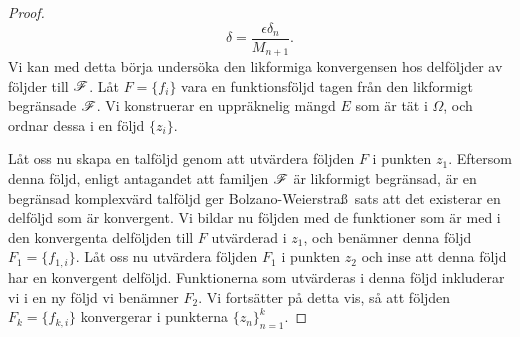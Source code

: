 \begin{proof}
	\begin{equation}
		\label{eq:equidelta}
		\delta = \frac{\epsilon \delta_n}{M_{n+1}}.
	\end{equation}
	Vi kan med detta börja undersöka den likformiga konvergensen hos delföljder av följder till $\mathscr{F}$. Låt $F = \{ f_i \}$ vara en funktionsföljd tagen från den likformigt begränsade $\mathscr{F}$. Vi konstruerar en uppräknelig mängd $E$ som är tät i $\Omega$, och ordnar dessa i en följd $\{ z_i \}$.

    Låt oss nu skapa en talföljd genom att utvärdera följden $F$ i punkten $z_1$. Eftersom denna följd, enligt antagandet att familjen $\mathscr{F}$ är likformigt begränsad, är en begränsad komplexvärd talföljd ger Bolzano-Weierstra\ss~sats att det existerar en delföljd som är konvergent. Vi bildar nu följden med de funktioner som är med i den konvergenta delföljden till $F$ utvärderad i $z_1$, och benämner denna följd $F_1 = \{ f_{1,i}\}$. Låt oss nu utvärdera följden $F_1$ i punkten $z_2$ och inse att denna följd har en konvergent delföljd. Funktionerna som utvärderas i denna följd inkluderar vi i en ny följd vi benämner $F_2$. Vi fortsätter på detta vis, så att följden $F_k = \{ f_{k,i}\}$ konvergerar i punkterna $\{z_n\}_{n=1}^k$.


\end{proof}
